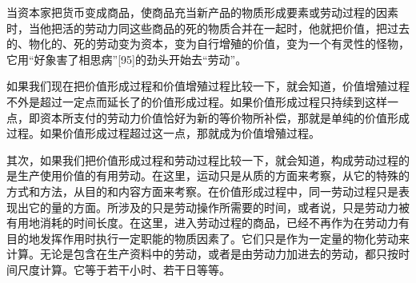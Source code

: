 \documentclass{ctexbook}
\begin{document}
    当资本家把货币变成商品，使商品充当新产品的物质形成要素或劳动过程的因素时，当他把活的劳动力同这些商品的死的物质合并在一起时，他就把价值，把过去的、物化的、死的劳动变为资本，变为自行增殖的价值，变为一个有灵性的怪物，它用“好象害了相思病”[95]的劲头开始去“劳动”。
    
    如果我们现在把价值形成过程和价值增殖过程比较一下，就会知道，价值增殖过程不外是超过一定点而延长了的价值形成过程。如果价值形成过程只持续到这样一点，即资本所支付的劳动力价值恰好为新的等价物所补偿，那就是单纯的价值形成过程。如果价值形成过程超过这一点，那就成为价值增殖过程。
    
    其次，如果我们把价值形成过程和劳动过程比较一下，就会知道，构成劳动过程的是生产使用价值的有用劳动。在这里，运动只是从质的方面来考察，从它的特殊的方式和方法，从目的和内容方面来考察。在价值形成过程中，同一劳动过程只是表现出它的量的方面。所涉及的只是劳动操作所需要的时间，或者说，只是劳动力被有用地消耗的时间长度。在这里，进入劳动过程的商品，已经不再作为在劳动力有目的地发挥作用时执行一定职能的物质因素了。它们只是作为一定量的物化劳动来计算。无论是包含在生产资料中的劳动，或者是由劳动力加进去的劳动，都只按时间尺度计算。它等于若干小时、若干日等等。
    
\end{document}
